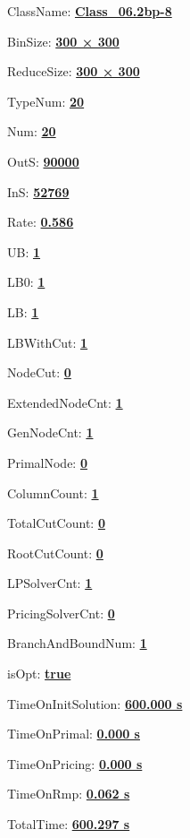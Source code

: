 \documentclass[11pt]{article}
\begin{document}
\pagestyle{empty}


ClassName: \underline{\textbf{Class_06.2bp-8}}
\par
BinSize: \underline{\textbf{300 × 300}}
\par
ReduceSize: \underline{\textbf{300 × 300}}
\par
TypeNum: \underline{\textbf{20}}
\par
Num: \underline{\textbf{20}}
\par
OutS: \underline{\textbf{90000}}
\par
InS: \underline{\textbf{52769}}
\par
Rate: \underline{\textbf{0.586}}
\par
UB: \underline{\textbf{1}}
\par
LB0: \underline{\textbf{1}}
\par
LB: \underline{\textbf{1}}
\par
LBWithCut: \underline{\textbf{1}}
\par
NodeCut: \underline{\textbf{0}}
\par
ExtendedNodeCnt: \underline{\textbf{1}}
\par
GenNodeCnt: \underline{\textbf{1}}
\par
PrimalNode: \underline{\textbf{0}}
\par
ColumnCount: \underline{\textbf{1}}
\par
TotalCutCount: \underline{\textbf{0}}
\par
RootCutCount: \underline{\textbf{0}}
\par
LPSolverCnt: \underline{\textbf{1}}
\par
PricingSolverCnt: \underline{\textbf{0}}
\par
BranchAndBoundNum: \underline{\textbf{1}}
\par
isOpt: \underline{\textbf{true}}
\par
TimeOnInitSolution: \underline{\textbf{600.000 s}}
\par
TimeOnPrimal: \underline{\textbf{0.000 s}}
\par
TimeOnPricing: \underline{\textbf{0.000 s}}
\par
TimeOnRmp: \underline{\textbf{0.062 s}}
\par
TotalTime: \underline{\textbf{600.297 s}}
\par
\newpage
\end{document}
